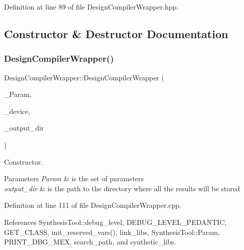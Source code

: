 Definition at line 89 of file Design\+Compiler\+Wrapper.\+hpp.



\subsection{Constructor \& Destructor Documentation}
\mbox{\label{classDesignCompilerWrapper_ad8c376e22927c521741e50efe5423c2e}} 
\subsubsection{\texorpdfstring{Design\+Compiler\+Wrapper()}{DesignCompilerWrapper()}}
{\footnotesize\ttfamily Design\+Compiler\+Wrapper\+::\+Design\+Compiler\+Wrapper (\begin{DoxyParamCaption}\item[{const \hyperlink{Parameter_8hpp_a37841774a6fcb479b597fdf8955eb4ea}{Parameter\+Const\+Ref}}]{\+\_\+\+Param,  }\item[{const \hyperlink{target__device_8hpp_acedb2b7a617e27e6354a8049fee44eda}{target\+\_\+device\+Ref}}]{\+\_\+device,  }\item[{const std\+::string \&}]{\+\_\+output\+\_\+dir }\end{DoxyParamCaption})}



Constructor. 


\begin{DoxyParams}{Parameters}
{\em Param} & is the set of parameters \\
\hline
{\em output\+\_\+dir} & is the path to the directory where all the results will be stored \\
\hline
\end{DoxyParams}


Definition at line 111 of file Design\+Compiler\+Wrapper.\+cpp.



References Synthesis\+Tool\+::debug\+\_\+level, D\+E\+B\+U\+G\+\_\+\+L\+E\+V\+E\+L\+\_\+\+P\+E\+D\+A\+N\+T\+IC, G\+E\+T\+\_\+\+C\+L\+A\+SS, init\+\_\+reserved\+\_\+vars(), link\+\_\+libs, Synthesis\+Tool\+::\+Param, P\+R\+I\+N\+T\+\_\+\+D\+B\+G\+\_\+\+M\+EX, search\+\_\+path, and synthetic\+\_\+libs.

